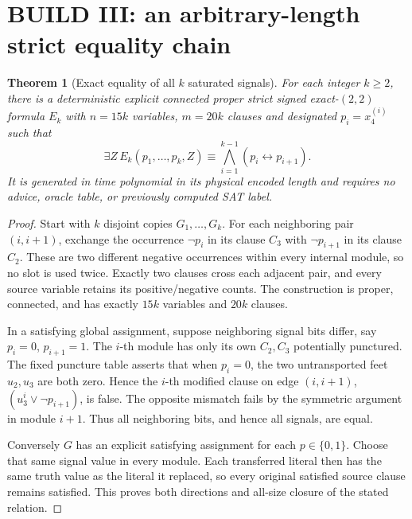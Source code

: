 \documentclass[11pt]{article}
\newtheorem{theorem}{Theorem}
\begin{document}
\section{BUILD III: an arbitrary-length strict equality chain}
\begin{theorem}[Exact equality of all $k$ saturated signals]
For each integer $k\ge2$, there is a deterministic explicit connected proper strict signed exact-$(2,2)$ formula $E_k$ with $n=15k$ variables, $m=20k$ clauses and designated $p_i=x_4^{(i)}$ such that
\[
 \exists Z\,E_k(p_1,\ldots,p_k,Z)
 \equiv \bigwedge_{i=1}^{k-1}(p_i\leftrightarrow p_{i+1}).
\]
It is generated in time polynomial in its physical encoded length and requires no advice, oracle table, or previously computed SAT label.
\end{theorem}
\begin{proof}
Start with $k$ disjoint copies $G_1,\ldots,G_k$. For each neighboring pair $(i,i+1)$, exchange the occurrence $\neg p_i$ in its clause $C_3$ with $\neg p_{i+1}$ in its clause $C_2$. These are two different negative occurrences within every internal module, so no slot is used twice. Exactly two clauses cross each adjacent pair, and every source variable retains its positive/negative counts. The construction is proper, connected, and has exactly $15k$ variables and $20k$ clauses.

In a satisfying global assignment, suppose neighboring signal bits differ, say $p_i=0$, $p_{i+1}=1$. The $i$-th module has only its own $C_2,C_3$ potentially punctured. The fixed puncture table asserts that when $p_i=0$, the two untransported feet $u_2,u_3$ are both zero. Hence the $i$-th modified clause on edge $(i,i+1)$, $(u_3^i\lor\neg p_{i+1})$, is false. The opposite mismatch fails by the symmetric argument in module $i+1$. Thus all neighboring bits, and hence all signals, are equal.

Conversely $G$ has an explicit satisfying assignment for each $p\in\{0,1\}$. Choose that same signal value in every module. Each transferred literal then has the same truth value as the literal it replaced, so every original satisfied source clause remains satisfied. This proves both directions and all-size closure of the stated relation.
\end{proof}
\end{document}

